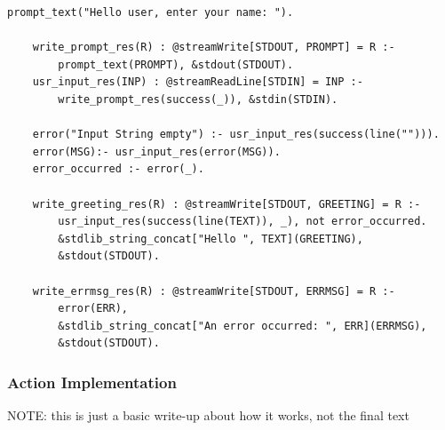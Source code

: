 \begin{example}
\begin{lstlisting}[style=asp-code, label={lst:implementation-actions-supported1}, caption={A supported version of the "greeter" application.}]
    prompt_text("Hello user, enter your name: ").
        
    write_prompt_res(R) : @streamWrite[STDOUT, PROMPT] = R :- 
        prompt_text(PROMPT), &stdout(STDOUT).
    usr_input_res(INP) : @streamReadLine[STDIN] = INP :- 
        write_prompt_res(success(_)), &stdin(STDIN).

    error("Input String empty") :- usr_input_res(success(line(""))).
    error(MSG):- usr_input_res(error(MSG)).
    error_occurred :- error(_).  

    write_greeting_res(R) : @streamWrite[STDOUT, GREETING] = R :- 
        usr_input_res(success(line(TEXT)), _), not error_occurred.
        &stdlib_string_concat["Hello ", TEXT](GREETING),
        &stdout(STDOUT).
        
    write_errmsg_res(R) : @streamWrite[STDOUT, ERRMSG] = R :-
        error(ERR),
        &stdlib_string_concat["An error occurred: ", ERR](ERRMSG),
        &stdout(STDOUT).
\end{lstlisting}       

\end{example}     



\subsubsection{Action Implementation}
\label{subsucsec:implementation-actions-execution}

NOTE: this is just a basic write-up about how it works, not the final text

